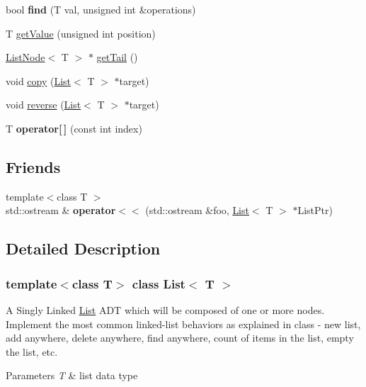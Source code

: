 \begin{DoxyCompactItemize}
\item 
\mbox{\label{class_list_a4cbb3644171b1babab212a04406f7b32}} 
bool {\bfseries find} (T val, unsigned int \&operations)
\item 
T \hyperlink{class_list_a54d9d5eb688177d16ae8f33a317282a5}{get\+Value} (unsigned int position)
\item 
\hyperlink{class_list_node}{List\+Node}$<$ T $>$ $\ast$ \hyperlink{class_list_a9d222b730d906bcf6fb0834c9c729788}{get\+Tail} ()
\item 
void \hyperlink{class_list_ac6c3b0e253ce3c9b90053b95769f12a9}{copy} (\hyperlink{class_list}{List}$<$ T $>$ $\ast$target)
\item 
void \hyperlink{class_list_ac17012219fedb7d746f5c13501af164e}{reverse} (\hyperlink{class_list}{List}$<$ T $>$ $\ast$target)
\item 
\mbox{\label{class_list_a8133b9df5dcb7941610a4949be986660}} 
T {\bfseries operator\mbox{[}$\,$\mbox{]}} (const int index)
\end{DoxyCompactItemize}
\subsection*{Friends}
\begin{DoxyCompactItemize}
\item 
\mbox{\label{class_list_a79a617fcbf0937a4ef1f1df45558dcc4}} 
{\footnotesize template$<$class T $>$ }\\std\+::ostream \& {\bfseries operator$<$$<$} (std\+::ostream \&foo, \hyperlink{class_list}{List}$<$ T $>$ $\ast$List\+Ptr)
\end{DoxyCompactItemize}


\subsection{Detailed Description}
\subsubsection*{template$<$class T$>$\newline
class List$<$ T $>$}

A Singly Linked \hyperlink{class_list}{List} A\+DT which will be composed of one or more nodes. Implement the most common linked-\/list behaviors as explained in class -\/ new list, add anywhere, delete anywhere, find anywhere, count of items in the list, empty the list, etc. 
\begin{DoxyParams}{Parameters}
{\em T} & list data type \\
\hline
\end{DoxyParams}


